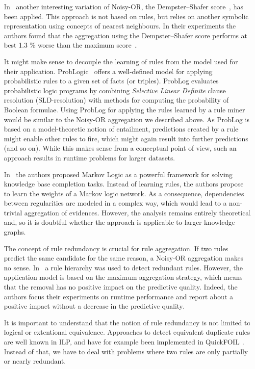 \documentclass[akbc,twoside,11pt,lettersize]{article}
\begin{document}
In~\cite{Ferre2020} another interesting variation of Noisy-OR, the Dempster–Shafer score~\cite{denoeux}, has been applied. This approach is not based on rules, but relies on another symbolic representation using concepts of nearest neighbours. In their experiments the authors found that the aggregation using the Dempster–Shafer score performs at best 1.3 \% worse than the maximum score~\cite{Ferre2020}.

It might make sense to decouple the learning of rules from the model used for their application. ProbLogic~\cite{de2007problog} offers a well-defined model for applying probabilistic rules to a given set of facts (or triples). ProbLog evaluates probabilistic logic programs by combining \textit{Selective Linear Definite} clause resolution (SLD-resolution) with methods for computing the probability of Boolean formulae. Using ProbLog for applying the rules learned by a rule miner would be similar to the Noisy-OR aggregation we described above. As ProbLog is based on a model-theoretic notion of entailment, predictions created by a rule might enable other rules to fire, which might again result into further predictions (and so on). While this makes sense from a conceptual point of view, such an approach results in runtime problems for larger datasets.

In~\cite{pmlr-v115-kuzelka20a} the authors proposed Markov Logic as a powerful framework for solving knowledge base completion tasks. Instead of learning rules, the authors propose to learn the weights of a Markov logic network. As a consequence, dependencies between regularities are modeled in a complex way, which would lead to a non-trivial aggregation of evidences. However, the analysis remains entirely theoretical and, so it is doubtful whether the approach is applicable to larger knowledge graphs.

The concept of rule redundancy is crucial for rule aggregation. If two rules predict the same candidate for the same reason, a Noisy-OR aggregation makes no sense. In~\cite{gu2020building} a rule hierarchy was used to detect redundant rules. However, the application model is based on the maximum aggregation strategy, which means that the removal has no positive impact on the predictive quality. Indeed, the authors focus their experiments on runtime performance and report about a positive impact without a decrease in the predictive quality. 


It is important to understand that the notion of rule redundancy is not limited to logical or extentional equivalence. Approaches to detect equivalent duplicate rules are well known in ILP, and have for example been implemented in QuickFOIL~\cite{zeng2014quickfoil}. Instead of that, we have to deal with problems where two rules are only partially or nearly redundant. 
\end{document}
